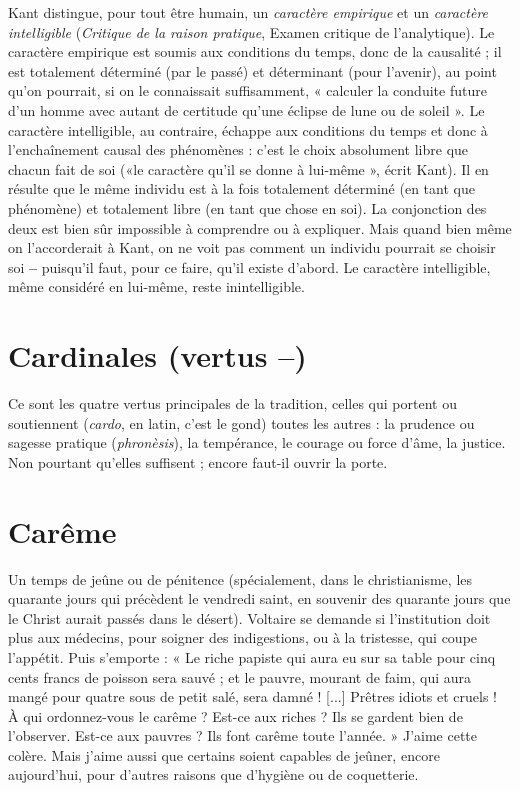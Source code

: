 Kant distingue, pour tout être humain, un {\it caractère empirique} et un {\it caractère
intelligible} ({\it Critique de la raison pratique}, Examen critique de l’analytique).
Le caractère empirique est soumis aux conditions du temps, donc de la
causalité ; il est totalement déterminé (par le passé) et déterminant (pour
l'avenir), au point qu’on pourrait, si on le connaissait suffisamment, « calculer
la conduite future d’un homme avec autant de certitude qu’une éclipse de lune
ou de soleil ». Le caractère intelligible, au contraire, échappe aux conditions du
temps et donc à l’enchaînement causal des phénomènes : c’est le choix absolument
libre que chacun fait de soi («le caractère qu’il se donne à lui-même »,
écrit Kant). Il en résulte que le même individu est à la fois totalement déterminé
(en tant que phénomène) et totalement libre (en tant que chose en soi).
La conjonction des deux est bien sûr impossible à comprendre ou à expliquer.
Mais quand bien même on l’accorderait à Kant, on ne voit pas comment un
individu pourrait se choisir soi {\bf --} puisqu'il faut, pour ce faire, qu’il existe
d’abord. Le caractère intelligible, même considéré en lui-même, reste inintelligible.

\section{Cardinales (vertus {\bf --})}
Ce sont les quatre vertus principales de la tradition,
celles qui portent ou soutiennent ({\it cardo},
en latin, c’est le gond) toutes les autres : la prudence ou sagesse pratique ({\it phronèsis}),
la tempérance, le courage ou force d’âme, la justice. Non pourtant
qu’elles suffisent ; encore faut-il ouvrir la porte.

\section{Carême}
Un temps de jeûne ou de pénitence (spécialement, dans le christianisme,
les quarante jours qui précèdent le vendredi saint, en
souvenir des quarante jours que le Christ aurait passés dans le désert). Voltaire
se demande si l'institution doit plus aux médecins, pour soigner des indigestions,
ou à la tristesse, qui coupe l'appétit. Puis s’emporte : « Le riche papiste
qui aura eu sur sa table pour cinq cents francs de poisson sera sauvé ; et le
pauvre, mourant de faim, qui aura mangé pour quatre sous de petit salé, sera
damné ! [...] Prêtres idiots et cruels ! À qui ordonnez-vous le carême ? Est-ce
aux riches ? Ils se gardent bien de l’observer. Est-ce aux pauvres ? Ils font
carême toute l’année. » J'aime cette colère. Mais j'aime aussi que certains soient
capables de jeûner, encore aujourd’hui, pour d’autres raisons que d’hygiène ou
de coquetterie.

